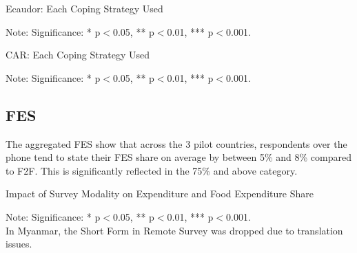 \documentclass[11pt,harvard]{article}
\begin{document}
	\begin{table}[htbp]
		\centering
		\begin{adjustbox}{max width=\textwidth}
			\begin{threeparttable}
				\caption{Ecaudor: Each Coping Strategy Used}
				\scriptsize
				 
				\label{tab:LCS_Ind_Modality_Ecuador}
				\begin{tablenotes}
					\item Note: Significance: * p$<$0.05, ** p$<$0.01, *** p$<$0.001. 
				\end{tablenotes}
			\end{threeparttable}
		\end{adjustbox}
		
	\end{table}
	\begin{table}[htbp]
		\centering
		\begin{adjustbox}{max width=\textwidth}
			\begin{threeparttable}
				\caption{CAR: Each Coping Strategy Used}
				\scriptsize
				 
				\label{tab:LCS_Ind_Modality_CAR}
				\begin{tablenotes}
					\item Note: Significance: * p$<$0.05, ** p$<$0.01, *** p$<$0.001. 
				\end{tablenotes}
			\end{threeparttable}
		\end{adjustbox}
	\end{table}
	
	\pagebreak
	
	\subsection{FES}
	
	The aggregated FES show that across the 3 pilot countries, respondents over the phone tend to state their FES share on average by between 5\% and 8\% compared to F2F. This is significantly reflected in the 75\% and above category.
	
	\begin{table}[htbp]
		\centering
		\begin{adjustbox}{max width=\textwidth}
			\begin{threeparttable}
				\caption{Impact of Survey Modality on Expenditure and Food Expenditure Share}
				\scriptsize
				 
				\label{tab:FES_Modality_All_Country}
				\begin{tablenotes}
					\item Note: Significance: * p$<$0.05, ** p$<$0.01, *** p$<$0.001. \\ 
					In Myanmar, the Short Form in Remote Survey was dropped due to translation issues.
				\end{tablenotes}
			\end{threeparttable}
		\end{adjustbox}
	\end{table}
	
\end{document}
